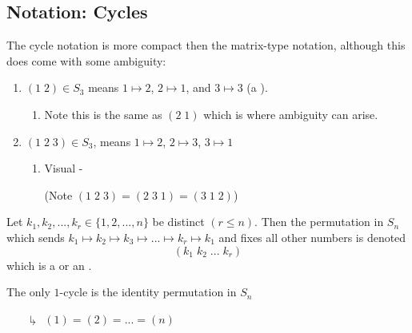 \documentclass[12pt, a4paper, oneside, openright, titlepage]{book}
\begin{document}
\subsection{\textsection Notation: Cycles}

The cycle notation is more compact then the matrix-type notation, although this does come with some ambiguity:

\begin{eg}
    \leavevmode
    \begin{enumerate}
        \item $(1\;2) \in S_3$ means $1 \mapsto 2$, $2\mapsto 1$, and $3\mapsto 3$ (a ).
        \begin{enumerate}[label =\(\drsh\)]
            \item Note this is the same as $(2\;1)$ which is where ambiguity can arise.
        \end{enumerate}
        \item $(1\;2\;3) \in S_3$, means $1 \mapsto 2$, $2\mapsto 3$, $3\mapsto 1$
        \begin{enumerate}[label = $\drsh$]
            \item Visual - 
            (Note $(1\;2\;3) = (2\;3\;1) = (3\;1\;2)$)
        \end{enumerate}
    \end{enumerate}
\end{eg}


\begin{defn}
    Let $k_1,k_2,..., k_r \in \{1,2,...,n\}$ be distinct $(r \leq n)$. Then the permutation in $S_n$ which sends $k_1\mapsto k_2\mapsto k_3\mapsto ... \mapsto k_r \mapsto k_1$ and fixes all other numbers is denoted \begin{equation}
        (k_1\;k_2\;...\;k_r)
    \end{equation}
    which is a  or an .
\end{defn}

\begin{rmk}
    The only $1$-cycle is the identity permutation in $S_n$
    \begin{enumerate}
        \item[$\drsh$] $(1) = (2) = ... = (n)$
    \end{enumerate}
\end{rmk}
\end{document}

